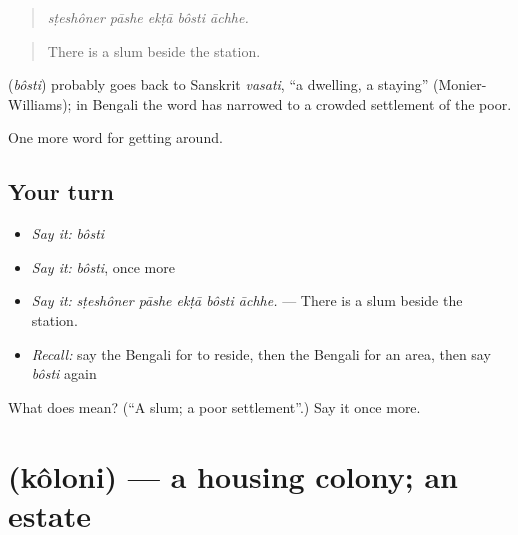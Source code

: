\begin{quote}
    
\end{quote}

\begin{quote}
\emph{sṭeshôner pāshe ekṭā bôsti āchhe.}
\end{quote}

\begin{quote}
There is a slum beside the station.
\end{quote}

\begin{cousinweb}
\textbf{} (\emph{bôsti}) probably goes back to Sanskrit \emph{vasati}, \textquotedblleft{}a dwelling, a staying\textquotedblright{} (Monier-Williams); in Bengali the word has narrowed to a crowded settlement of the poor.
\end{cousinweb}

\begin{grammarlens}[title={What you've built}]
One more word for getting around.
\end{grammarlens}

\subsection*{Your turn}
\begin{itemize}
\raggedright
  \item \emph{Say it:} \emph{bôsti}
  \item \emph{Say it:} \emph{bôsti}, once more
  \item \emph{Say it:} \emph{sṭeshôner pāshe ekṭā bôsti āchhe.} — There is a slum beside the station.
  \item \emph{Recall:} say the Bengali for to reside, then the Bengali for an area, then say \emph{bôsti} again
\end{itemize}

\begin{tcolorbox}[breakable,colback=teal!4,colframe=teal!35!black,title={Before you move on}]
What does  mean? (\textquotedblleft{}A slum; a poor settlement\textquotedblright{}.) Say it once more.
\end{tcolorbox}
\section[\texorpdfstring{\bn{কলোনি} (kôloni)}{কলোনি (kôloni)}]{ (kôloni) — a housing colony; an estate}

